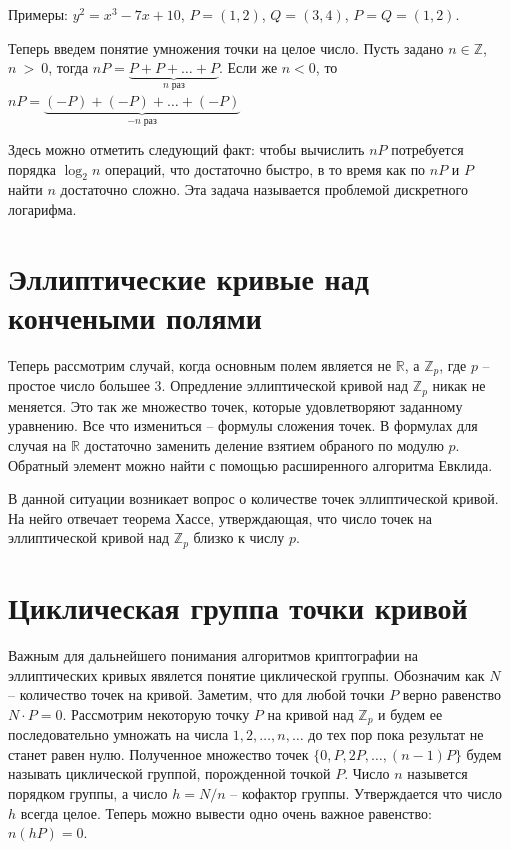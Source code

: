 \documentclass[a4paper,12pt]{article}
\begin{document}
        Примеры: $y^2 = x^3 - 7x + 10$, $P = (1, 2)$, $Q = (3, 4)$, $P = Q = (1, 2)$.

        Теперь введем понятие умножения точки на целое число. Пусть задано $n \in \mathbb{Z}$, $n~>~0$, тогда $nP = \underbrace{P + P + \dots + P}_{n\;\text{раз}}$. 
        Если же $n < 0$, то $nP = \underbrace{(-P) + (-P) + \dots + (-P)}_{-n \; \text{раз}}$

        Здесь можно отметить следующий факт: чтобы вычислить $nP$ потребуется порядка $\log_2{n}$ операций, что достаточно быстро, в
        то время как по $nP$ и $P$ найти $n$ достаточно сложно. Эта задача называется проблемой дискретного логарифма.

    \section{Эллиптические кривые над кончеными полями}
        Теперь рассмотрим случай, когда основным полем является не $\mathbb{R}$, а $\mathbb{Z}_p$, где $p$ -- простое 
        число большее 3. Опредление эллиптической кривой над $\mathbb{Z}_p$ никак не меняется. Это так же множество точек, которые удовлетворяют
        заданному уравнению. Все что измениться -- формулы сложения точек. В формулах для случая на $\mathbb{R}$ достаточно заменить деление взятием обраного по
        модулю $p$. Обратный элемент можно найти с помощью расширенного алгоритма Евклида. 
        
        В данной ситуации возникает вопрос о количестве точек эллиптической кривой. На нейго отвечает теорема Хассе, утверждающая, что число точек на эллиптической кривой над 
        $\mathbb{Z}_p$ близко к числу $p$.

    \section{Циклическая группа точки кривой}
        Важным для дальнейшего понимания алгоритмов криптографии на эллиптических кривых явялется понятие циклической группы. Обозначим как $N$ -- количество точек на кривой.
        Заметим, что для любой точки $P$ верно равенство $N \cdot P = 0$.
        Рассмотрим некоторую точку $P$ на кривой над $\mathbb{Z}_p$ и будем ее 
        последовательно умножать на числа $1, 2, \dots, n, \dots$ до тех пор пока результат не станет равен нулю. 
        Полученное множество точек $\{0, P, 2P, \dots, (n-1)P\}$ будем называть  циклической группой, порожденной точкой $P$. 
        Число $n$ назывется порядком группы, а число $h = N / n$ -- кофактор группы. Утверждается что число $h$ всегда целое. Теперь можно
        вывести одно очень важное равенство: $n(hP) = 0$. 
\end{document}
